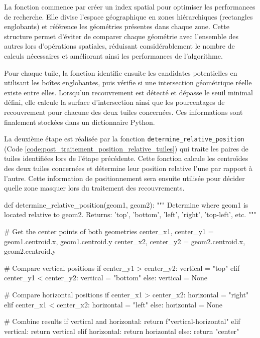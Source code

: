 La fonction commence par créer un index spatial pour optimiser les performances de recherche. Elle divise l'espace géographique en zones hiérarchiques (rectangles englobants) et référence les géométries présentes dans chaque zone. Cette structure permet d'éviter de comparer chaque géométrie avec l'ensemble des autres lors d'opérations spatiales, réduisant considérablement le nombre de calculs nécessaires et améliorant ainsi les performances de l'algorithme.

Pour chaque tuile, la fonction identifie ensuite les candidates potentielles en utilisant les boîtes englobantes, puis vérifie si une intersection géométrique réelle existe entre elles. Lorsqu'un recouvrement est détecté et dépasse le seuil minimal défini, elle calcule la surface d'intersection ainsi que les pourcentages de recouvrement pour chacune des deux tuiles concernées. Ces informations sont finalement stockées dans un dictionnaire Python.

La deuxième étape est réalisée par la fonction \texttt{determine\_relative\_position} (Code \ref{code:post_traitement_position_relative_tuiles}) qui traite les paires de tuiles identifiées lors de l'étape précédente. Cette fonction calcule les centroïdes des deux tuiles concernées et détermine leur position relative l'une par rapport à l'autre. Cette information de positionnement sera ensuite utilisée pour décider quelle zone masquer lors du traitement des recouvrements.

\begin{code}[H]
    \begin{pythoncode}
    def determine_relative_position(geom1, geom2):
        """
        Determine where geom1 is located relative to geom2.
        Returns: 'top', 'bottom', 'left', 'right', 'top-left', etc.
        """
        
        # Get the center points of both geometries
        center_x1, center_y1 = geom1.centroid.x, geom1.centroid.y
        center_x2, center_y2 = geom2.centroid.x, geom2.centroid.y
        
        # Compare vertical positions
        if center_y1 > center_y2:
            vertical = "top"
        elif center_y1 < center_y2:
            vertical = "bottom"
        else:
            vertical = None
        
        # Compare horizontal positions
        if center_x1 > center_x2:
            horizontal = "right"
        elif center_x1 < center_x2:
            horizontal = "left"
        else:
            horizontal = None
        
        # Combine results
        if vertical and horizontal:
            return f"{vertical}-{horizontal}"
        elif vertical:
            return vertical
        elif horizontal:
            return horizontal
        else:
            return "center"
    
    \end{pythoncode}
    \label{code:post_traitement_position_relative_tuiles}
\end{code}

